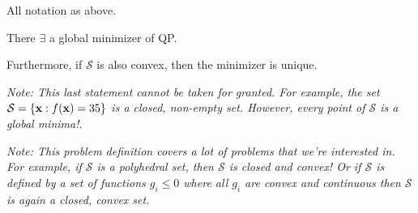 \begin{prop}{}{}
	All notation as above.

	\medskip
	There $\exists$ a global minimizer of QP. 

	Furthermore, if $\mathcal{S}$ is also convex, then the minimizer is unique.
\end{prop}

\textit{Note: This last statement cannot be taken for granted. For example, the
set $\mathcal{S} = \{ \mathbf{x} : f(\mathbf{x}) = 35\}$ is a closed, non-empty set. However,
every point of $\mathcal{S}$ is a global minima!}.

\textit{Note: This problem definition covers a lot of problems that we're interested in.
For example, if $\mathcal{S}$ is a polyhedral set, then $\mathcal{S}$ is closed and
convex! Or if $\mathcal{S}$ is defined by a set of functions $g_i \leq 0$ 
where all $g_i$ are convex and continuous then $\mathcal{S}$ is again a closed,
convex set.}

